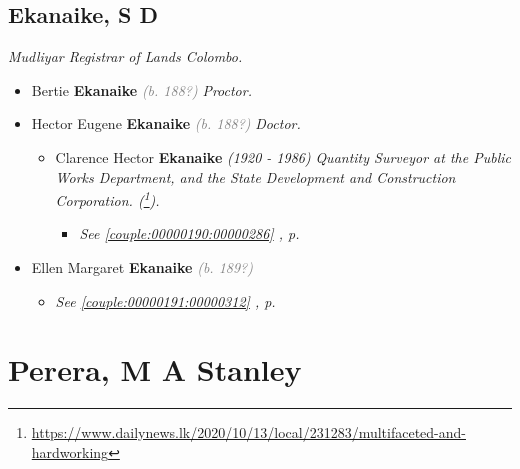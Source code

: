 \documentclass[10pt, openany]{book}
\begin{document}
\chapter{Ekanaike, S D}
\label{00000195}
\textcolor{slmaroon}{\textit{Mudliyar Registrar of Lands Colombo.}}
\begin{itemize}
\item{Bertie \textbf{Ekanaike} \textcolor{gray}{\textit{(b. 188?)}} \textcolor{slmaroon}{\textit{Proctor.}}
 }
\item{Hector Eugene \textbf{Ekanaike} \textcolor{gray}{\textit{(b. 188?)}} \textcolor{slmaroon}{\textit{Doctor.}}
\begin{itemize}
\item{Clarence Hector \textbf{Ekanaike} \textcolor{slorange}{\textit{(1920 - 1986)}} \textcolor{slmaroon}{\textit{Quantity Surveyor at the Public Works Department, and the State Development and Construction Corporation. (\footnote{\url{https://www.dailynews.lk/2020/10/13/local/231283/multifaceted-and-hardworking}}).}}
\begin{itemize}
\item{\textcolor{slteal}{\textit{See  \autoref{couple:00000190:00000286} \textit{, p. \pageref{couple:00000190:00000286} }}}}
\end{itemize}
  }
\end{itemize}
  }
\item{Ellen Margaret \textbf{Ekanaike} \textcolor{gray}{\textit{(b. 189?)}}
\begin{itemize}
\item{\textcolor{slteal}{\textit{See  \autoref{couple:00000191:00000312} \textit{, p. \pageref{couple:00000191:00000312} }}}}
\end{itemize}
  }
\end{itemize}
  
\part{Perera, M A Stanley}
\end{document}
